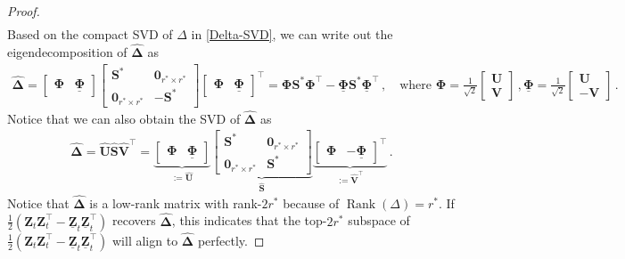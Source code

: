 \begin{proof}
\begin{align*}
\end{align*}
Based on the compact SVD of $\Delta$ in \cref{Delta-SVD}, we can write out the eigendecomposition of $\hat{\bm \Delta}$ as
\begin{align}\label{sym-Delta-eigen}
    \hat{\bm \Delta} = \begin{bmatrix}
        \bm \Phi & \underline{\bm \Phi}
    \end{bmatrix}\begin{bmatrix}
        \bm S^* & \bm 0_{r^*\times r^*}\\
        \bm 0_{r^*\times r^*} & -\bm S^*
    \end{bmatrix}\begin{bmatrix}
        \bm \Phi & \underline{\bm \Phi}
    \end{bmatrix}^{\!\top} =\bm \Phi \bm S^* \bm \Phi^{\!\top} - \underline{\bm \Phi} \bm S^* \underline{\bm \Phi}^{\!\top}\,,\quad \text{where }
    \bm \Phi = \frac{1}{\sqrt{2}}\begin{bmatrix}
        \bm U \\ \bm V
    \end{bmatrix}\,,
    \underline{\bm \Phi} = \frac{1}{\sqrt{2}}\begin{bmatrix}
        \bm U \\ -\bm V
    \end{bmatrix}\,.
\end{align}
Notice that we can also obtain the SVD of $\hat{\bm \Delta}$ as
\begin{align}\label{sym-Delta-SVD}
    \hat{\bm \Delta} = \widehat{\bm U}\widehat{\bm S}\widehat{\bm V}^{\!\top} =\underbrace{\begin{bmatrix}
        \bm \Phi & \underline{\bm \Phi}
    \end{bmatrix}}_{:=\widehat{\bm U}}\underbrace{\begin{bmatrix}
        \bm S^* & \bm 0_{r^*\times r^*}\\
        \bm 0_{r^*\times r^*} & \bm S^*
    \end{bmatrix}}_{\widehat{\bm S}}\underbrace{\begin{bmatrix}
        \bm \Phi & -\underline{\bm \Phi}
    \end{bmatrix}^{\!\top}}_{:=\widehat{\bm V}^{\!\top}}\,.
\end{align}
Notice that $\hat{\bm \Delta}$ is a low-rank matrix with rank-$2r^*$ because of $\operatorname{Rank}\left(\Delta\right)=r^*$. If $\frac{1}{2}\left(\bm Z_t\bm Z_t^{\!\top}-\underline{\bm Z}_t\underline{\bm Z}_t^{\!\top}\right)$ recovers $\hat{\bm \Delta}$, this indicates that the top-$2r^*$ subspace of $\frac{1}{2}\left(\bm Z_t\bm Z_t^{\!\top}-\underline{\bm Z}_t\underline{\bm Z}_t^{\!\top}\right)$ will align to $\hat{\bm \Delta}$ perfectly.

\end{proof}
